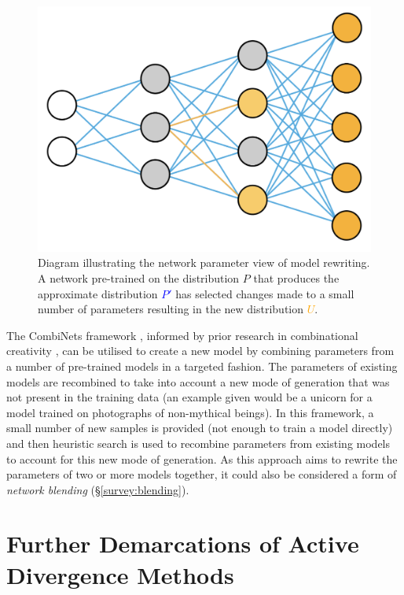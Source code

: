 \begin{figure}[!htbp]
    \centering
    \includegraphics[width=1\textwidth]{figures/c6_active_div/diagrams/model_rewriting.png}
    \caption[Diagram illustrating the network parameter view of model rewriting.]{Diagram illustrating the network parameter view of model rewriting. A network pre-trained on the distribution $P$ that produces the approximate distribution \textcolor{blue}{$P'$} has selected changes made to a small number of parameters resulting in the new distribution \textcolor{orange}{$U$}.}
  \label{fig:c6:model-rewriting}
  \end{figure}

The CombiNets framework \citep{guzdial2018combinets}, informed by prior research in combinational creativity \citep{boden2004creative}, can be utilised to create a new model by combining parameters from a number of pre-trained models in a targeted fashion. 
The parameters of existing models are recombined to take into account a new mode of generation that was not present in the training data (an example given would be a unicorn for a model trained on photographs of non-mythical beings). 
In this framework, a small number of new samples is provided (not enough to train a model directly) and then heuristic search is used to recombine parameters from existing models to account for this new mode of generation.
As this approach aims to rewrite the parameters of two or more models together, it could also be considered a form of \textit{network blending} (\S \ref{survey:blending}).

\section{Further Demarcations of Active Divergence Methods}

